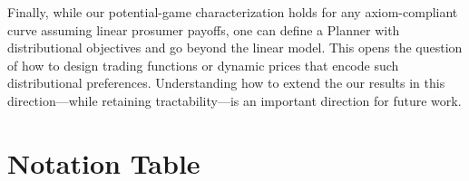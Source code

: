 \documentclass[12pt, notitlepage]{article}
\begin{document}
Finally, while our potential-game characterization holds for any axiom-compliant curve assuming linear prosumer payoffs, one can define a Planner with distributional objectives and go beyond the linear model. This opens the question of how to design trading functions or dynamic prices that encode such distributional preferences. Understanding how to extend the our results in this direction---while retaining tractability---is an important direction for future work. 




\appendix

\newpage
\section{Notation Table}
\end{document}
